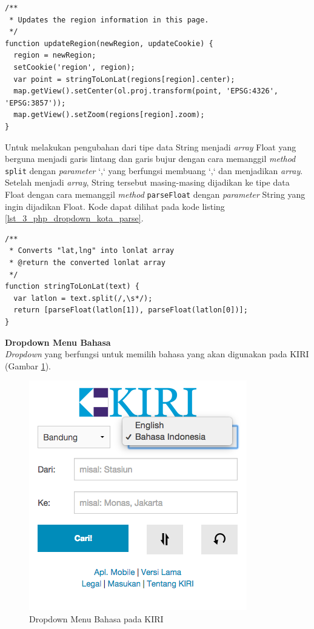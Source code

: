 \documentclass[a4paper,twoside]{article}
\begin{document}
\begin{enumerate}
\begin{lstlisting}[caption=Fungsi JavaScript untuk memperbarui peta ,label = {lst_3_php_dropdown_kota_update}]
/**
 * Updates the region information in this page.
 */
function updateRegion(newRegion, updateCookie) {
  region = newRegion;
  setCookie('region', region);
  var point = stringToLonLat(regions[region].center);
  map.getView().setCenter(ol.proj.transform(point, 'EPSG:4326', 'EPSG:3857'));
  map.getView().setZoom(regions[region].zoom);
}
\end{lstlisting}

Untuk melakukan pengubahan dari tipe data String menjadi \textit{array} Float yang berguna menjadi garis lintang dan garis bujur dengan cara memanggil \textit{method} \verb!split! dengan \textit{parameter} `,` yang berfungsi membuang `,` dan menjadikan \textit{array}. Setelah menjadi \textit{array}, String tersebut masing-masing dijadikan ke tipe data Float dengan cara memanggil \textit{method} \verb!parseFloat! dengan \textit{parameter} String yang ingin dijadikan Float. Kode dapat dilihat pada kode listing \ref{lst_3_php_dropdown_kota_parse}.

\begin{lstlisting}[caption=Fungsi JavaScript untuk mengubah String menjadi \textit{array} Float ,label = {lst_3_php_dropdown_kota_parse}]
/**
 * Converts "lat,lng" into lonlat array
 * @return the converted lonlat array
 */
function stringToLonLat(text) {
  var latlon = text.split(/,\s*/);
  return [parseFloat(latlon[1]), parseFloat(latlon[0])];
}
\end{lstlisting}

\textbf{Dropdown Menu Bahasa}\\
\textit{Dropdown} yang berfungsi untuk memilih bahasa yang akan digunakan pada KIRI (Gambar \ref{fig:3_KIRI_drop_bahasa}).

\begin{figure}[H]
  \centering
  \includegraphics[scale=0.5]{Gambar/KIRI-drop-bahasa}
  \caption{Dropdown Menu Bahasa pada KIRI} 
  \label{fig:3_KIRI_drop_bahasa}
\end{figure}


\end{enumerate}
\end{document}
